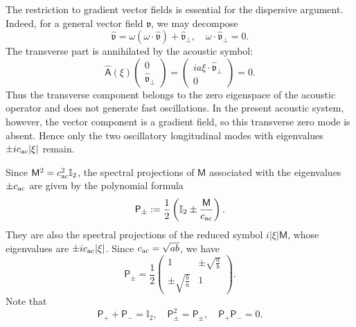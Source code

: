 \documentclass[10pt,reqno]{amsart}
\numberwithin{equation}{section}
\newcommand{\lt}{\left}
\newcommand{\rt}{\right}
\newcommand{\bq}{\begin{equation}}
\newcommand{\eq}{\end{equation}}
\begin{document}
 
The restriction to gradient vector fields is essential for the dispersive argument. Indeed, for a general vector field $\mathfrak v$, we may decompose
\[
\widehat{\mathfrak v} = \omega\lt(\omega\cdot\widehat{\mathfrak v}\rt) + \widehat{\mathfrak v}_\perp, \quad \omega\cdot\widehat{\mathfrak v}_\perp=0.
\]
The transverse part is annihilated by the acoustic symbol:
\[
\widehat{\mathsf A}(\xi)
\begin{pmatrix}
0\\
\widehat{\mathfrak v}_\perp
\end{pmatrix}
=
\begin{pmatrix}
ia\xi\cdot\widehat{\mathfrak v}_\perp\\
0
\end{pmatrix}
= 0.
\]
Thus the transverse component belongs to the zero eigenspace of the acoustic operator and does not generate fast oscillations. In the present acoustic system, however, the vector component is a gradient field, so this transverse zero mode is absent. Hence only the two oscillatory longitudinal modes with eigenvalues $\pm ic_{\rm ac}|\xi|$ remain.
 

Since $\mathsf M^2=c_{\rm ac}^2\mathbb I_2$, the spectral projections of $\mathsf M$ associated with the eigenvalues $\pm c_{\rm ac}$ are given by the polynomial formula
\[
\mathsf P_\pm:=\frac{1}{2}\lt(\mathbb I_2\pm\frac{\mathsf M}{c_{\rm ac}}\rt).
\]
They are also the spectral projections of the reduced symbol $i|\xi|\mathsf M$, whose eigenvalues are $\pm ic_{\rm ac}|\xi|$. Since $c_{\rm ac}=\sqrt{ab}$, we have
\[
\mathsf P_\pm = \frac{1}{2}
\begin{pmatrix}
1 & \displaystyle \pm \sqrt{\frac{a}{b}} \\[2mm]
\displaystyle \pm \sqrt{\frac{b}{a}} & 1
\end{pmatrix}.
\]
Note that
\bq\label{eq:p-prop}
\mathsf P_+ + \mathsf P_- = \mathbb I_2, \quad \mathsf P_\pm^2 = \mathsf P_\pm, \quad \mathsf P_+ \mathsf P_- = 0.
\eq
 
\end{document}
